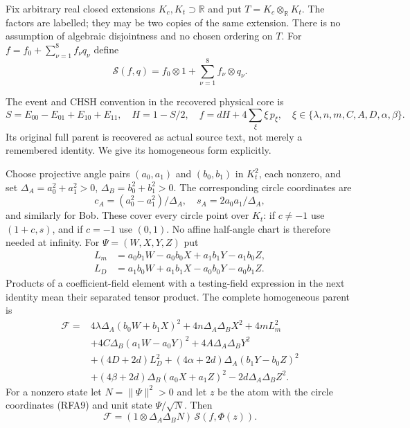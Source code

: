 Fix arbitrary real closed extensions $K_c,K_t\supset\mathbb R$ and put
$T=K_c\otimes_{\mathbb R}K_t$. The factors are labelled; they may be two
copies of the same extension. There is no assumption of algebraic
disjointness and no chosen ordering on $T$. For
$f=f_0+\sum_{\nu=1}^8f_\nu q_\nu$ define
\[
 \mathscr S(f,q)=f_0\otimes1+\sum_{\nu=1}^8f_\nu\otimes q_\nu.
 \tag{RFA7}
\]

The event and CHSH convention in the recovered physical core is
\[
 S=E_{00}-E_{01}+E_{10}+E_{11},\quad H=1-S/2,\quad
 f=dH+4\sum_{\xi}\xi\,p_\xi,
 \quad \xi\in\{\lambda,n,m,C,A,D,\alpha,\beta\}.
 \tag{RFA8}
\]
Its original full parent is recovered as actual source text, not merely
a remembered identity. We give its homogeneous form explicitly.

Choose projective angle pairs $(a_0,a_1)$ and $(b_0,b_1)$ in $K_t^2$,
each nonzero, and set
$\Delta_A=a_0^2+a_1^2>0$, $\Delta_B=b_0^2+b_1^2>0$.
The corresponding circle coordinates are
\[
 c_A=(a_0^2-a_1^2)/\Delta_A,\quad s_A=2a_0a_1/\Delta_A,
 \tag{RFA9}
\]
and similarly for Bob. These cover every circle point over $K_t$:
if $c\ne-1$ use $(1+c,s)$, and if $c=-1$ use $(0,1)$.
No affine half-angle chart is therefore needed at infinity.
For $\Psi=(W,X,Y,Z)$ put
\[
 \begin{split}
 L_m&=a_0b_1W-a_0b_0X+a_1b_1Y-a_1b_0Z,\\
 L_D&=a_1b_0W+a_1b_1X-a_0b_0Y-a_0b_1Z.
 \end{split}
\]
Products of a coefficient-field element with a testing-field expression
in the next identity mean their separated tensor product. The complete
homogeneous parent is
\[
 \begin{split}
 \mathcal F={}&4\lambda\Delta_A(b_0W+b_1X)^2
       +4n\Delta_A\Delta_BX^2+4mL_m^2\\
 &+4C\Delta_B(a_1W-a_0Y)^2+4A\Delta_A\Delta_BY^2\\
 &+(4D+2d)L_D^2
       +(4\alpha+2d)\Delta_A(b_1Y-b_0Z)^2\\
 &+(4\beta+2d)\Delta_B(a_0X+a_1Z)^2
       -2d\Delta_A\Delta_BZ^2.
 \end{split}                                                    \tag{RFA10}
\]
For a nonzero state let $N=\|\Psi\|^2>0$ and let $z$ be the atom
with the circle coordinates (RFA9) and unit state $\Psi/\sqrt N$.
Then
\[
 \mathcal F=(1\otimes\Delta_A\Delta_BN)\,
                 \mathscr S(f,\Phi(z)).
 \tag{RFA11}
\]

